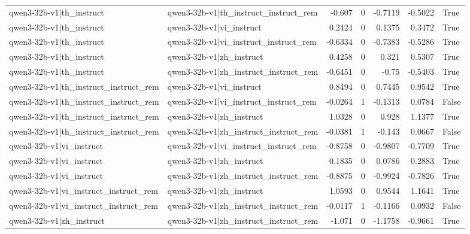 \begin{table}
\begin{tabular}{l l r r r r l}
qwen3-32b-v1|th_instruct & qwen3-32b-v1|th_instruct_instruct_rem & -0.607 & 0 & -0.7119 & -0.5022 & True \\
qwen3-32b-v1|th_instruct & qwen3-32b-v1|vi_instruct & 0.2424 & 0 & 0.1375 & 0.3472 & True \\
qwen3-32b-v1|th_instruct & qwen3-32b-v1|vi_instruct_instruct_rem & -0.6334 & 0 & -0.7383 & -0.5286 & True \\
qwen3-32b-v1|th_instruct & qwen3-32b-v1|zh_instruct & 0.4258 & 0 & 0.321 & 0.5307 & True \\
qwen3-32b-v1|th_instruct & qwen3-32b-v1|zh_instruct_instruct_rem & -0.6451 & 0 & -0.75 & -0.5403 & True \\
qwen3-32b-v1|th_instruct_instruct_rem & qwen3-32b-v1|vi_instruct & 0.8494 & 0 & 0.7445 & 0.9542 & True \\
qwen3-32b-v1|th_instruct_instruct_rem & qwen3-32b-v1|vi_instruct_instruct_rem & -0.0264 & 1 & -0.1313 & 0.0784 & False \\
qwen3-32b-v1|th_instruct_instruct_rem & qwen3-32b-v1|zh_instruct & 1.0328 & 0 & 0.928 & 1.1377 & True \\
qwen3-32b-v1|th_instruct_instruct_rem & qwen3-32b-v1|zh_instruct_instruct_rem & -0.0381 & 1 & -0.143 & 0.0667 & False \\
qwen3-32b-v1|vi_instruct & qwen3-32b-v1|vi_instruct_instruct_rem & -0.8758 & 0 & -0.9807 & -0.7709 & True \\
qwen3-32b-v1|vi_instruct & qwen3-32b-v1|zh_instruct & 0.1835 & 0 & 0.0786 & 0.2883 & True \\
qwen3-32b-v1|vi_instruct & qwen3-32b-v1|zh_instruct_instruct_rem & -0.8875 & 0 & -0.9924 & -0.7826 & True \\
qwen3-32b-v1|vi_instruct_instruct_rem & qwen3-32b-v1|zh_instruct & 1.0593 & 0 & 0.9544 & 1.1641 & True \\
qwen3-32b-v1|vi_instruct_instruct_rem & qwen3-32b-v1|zh_instruct_instruct_rem & -0.0117 & 1 & -0.1166 & 0.0932 & False \\
qwen3-32b-v1|zh_instruct & qwen3-32b-v1|zh_instruct_instruct_rem & -1.071 & 0 & -1.1758 & -0.9661 & True \\
\bottomrule
\end{tabular}
\end{table}
